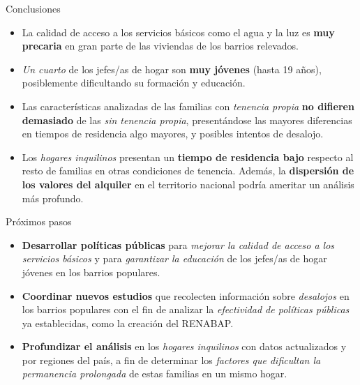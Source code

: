 \documentclass[aspectratio=169]{beamer}
\begin{document}
    \begin{frame}{Conclusiones}
        \setlength{\leftmargini}{8pt}
        \begin{itemize}
            \item<2-> La calidad de acceso a los servicios básicos como el agua y la luz es \textbf{muy precaria} en gran parte de las viviendas de los barrios relevados.
            \item<3->\textit{Un cuarto} de los jefes/as de hogar son \textbf{muy jóvenes} (hasta 19 años), posiblemente dificultando su formación y educación.
            \item<4-> Las características analizadas de las familias con \textit{tenencia propia} \textbf{no difieren demasiado} de las \textit{sin tenencia propia}, presentándose las mayores diferencias en tiempos de residencia algo mayores, y posibles intentos de desalojo.

            \item<5-> Los \textit{hogares inquilinos} presentan un \textbf{tiempo de residencia bajo} respecto al resto de familias en otras condiciones de tenencia. Además, la \textbf{dispersión de los valores del alquiler} en el territorio nacional podría ameritar un análisis más profundo.
        \end{itemize}
    \end{frame}

    \begin{frame}{Próximos pasos}
        \setlength{\leftmargini}{8pt}
        \begin{itemize}
            \item<2-> \textbf{Desarrollar políticas públicas} para \textit{mejorar la calidad de acceso a los servicios básicos} y para \textit{garantizar la educación} de los jefes/as de hogar jóvenes en los barrios populares.

            \item<3-> \textbf{Coordinar nuevos estudios} que recolecten información sobre \textit{desalojos} en los barrios populares con el fin de analizar la \textit{efectividad de políticas públicas} ya establecidas, como la creación del RENABAP.

            \item<4-> \textbf{Profundizar el análisis} en los \textit{hogares inquilinos} con datos actualizados y por regiones del país, a fin de determinar los \textit{factores que dificultan la permanencia prolongada} de estas familias en un mismo hogar.
        \end{itemize}
    \end{frame}
\end{document}

